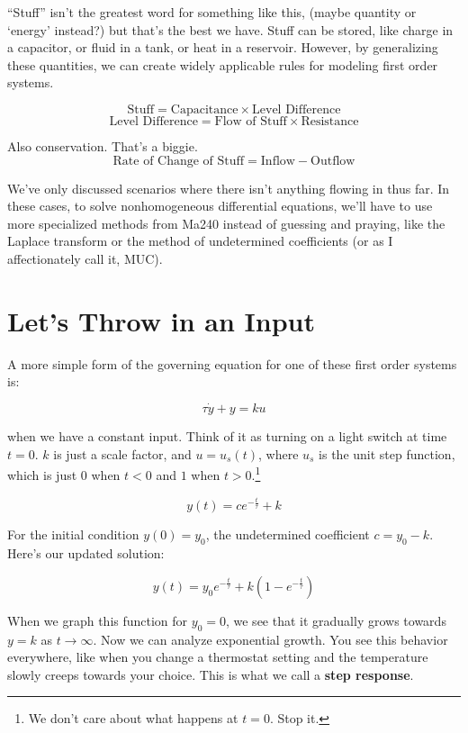 \documentclass{report}
\begin{document}
\begin{onehalfspacing}
\begin{flushleft}
\medskip

``Stuff'' isn't the greatest word for something like this, (maybe quantity  or `energy' instead?) but that's the best we have. Stuff can be stored, like charge in a capacitor, or fluid in a tank, or heat in a reservoir. However, by generalizing these quantities, we can create widely applicable rules for modeling first order systems.

\[\text{Stuff} = \text{Capacitance} \times \text{Level Difference}\]
\[\text{Level Difference} = \text{Flow of Stuff} \times \text{Resistance}\]

Also conservation. That's a biggie.
\[\text{Rate of Change of Stuff} = \text{Inflow} - \text{Outflow}\]

We've only discussed scenarios where there isn't anything flowing in thus far. In these cases, to solve nonhomogeneous differential equations, we'll have to use more specialized methods from Ma240 instead of guessing and praying, like the Laplace transform or the method of undetermined coefficients (or as I affectionately call it, MUC).

\section{Let's Throw in an Input}

A more simple form of the governing equation for one of these first order systems is:

\vspace{-0.1in}
\[\tau \dot{y} + y = ku\]

when we have a constant input. Think of it as turning on a light switch at time \(t=0\). \(k\) is just a scale factor, and \(u = u_s(t)\), where \(u_s\) is the unit step function, which is just \(0\) when \(t<0\) and \(1\) when \(t>0\).\footnote{We don't care about what happens at \(t=0\). Stop it.}

\vspace{-0.1in}
\[y(t) = ce^{-\frac{t}{\tau}} + k\]

For the initial condition \(y(0) = y_0\), the undetermined coefficient \(c=y_0 - k\). Here's our updated solution:

\vspace{-0.1in}
\[y(t) = y_0 e^{-\frac{t}{\tau}} + k(1-e^{-\frac{t}{\tau}})\]

When we graph this function for \(y_0 = 0\), we see that it gradually grows towards \(y=k\) as \(t\to\infty\). Now we can analyze exponential growth. You see this behavior everywhere, like when you change a thermostat setting and the temperature slowly creeps towards your choice. This is what we call a \textbf{step response}.


\end{flushleft}
\end{onehalfspacing}
\end{document}
